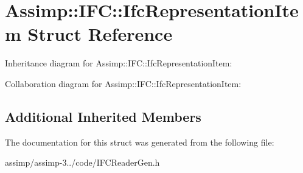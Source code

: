 \hypertarget{struct_assimp_1_1_i_f_c_1_1_ifc_representation_item}{\section{Assimp\+:\+:I\+F\+C\+:\+:Ifc\+Representation\+Item Struct Reference}
\label{struct_assimp_1_1_i_f_c_1_1_ifc_representation_item}
}


Inheritance diagram for Assimp\+:\+:I\+F\+C\+:\+:Ifc\+Representation\+Item\+:


Collaboration diagram for Assimp\+:\+:I\+F\+C\+:\+:Ifc\+Representation\+Item\+:
\subsection*{Additional Inherited Members}


The documentation for this struct was generated from the following file\+:\begin{DoxyCompactItemize}
\item 
assimp/assimp-\/3../code/I\+F\+C\+Reader\+Gen.\+h\end{DoxyCompactItemize}
